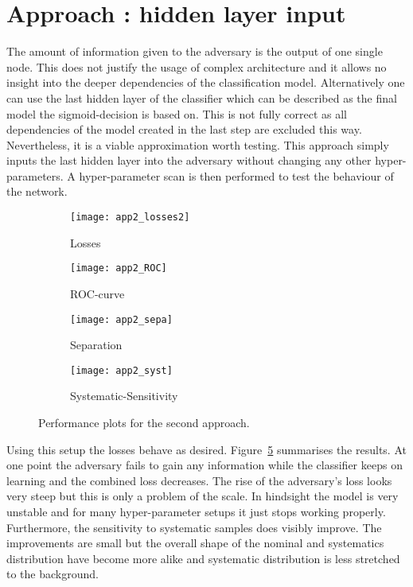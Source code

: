 \section{Approach : hidden layer input}

The amount of information given to the adversary is the output of one single node. This does not justify the usage of complex architecture and it allows no insight into the deeper dependencies of the classification model. Alternatively one can use the last hidden layer of the classifier which can be described as the final model the sigmoid-decision is based on. This is not fully correct as all dependencies of the model created in the last step are excluded this way. Nevertheless, it is a viable approximation worth testing.
This approach simply inputs the last hidden layer into the adversary without changing any other hyper-parameters. A hyper-parameter scan is then performed to test the behaviour of the network.
%
\begin{figure}[htbp]
    \centering
    \begin{subfigure}[b]{0.45\textwidth}
        \texttt{[image: app2\_losses2]}
        \caption{Losses}
        \label{fig:app2:losses}
    \end{subfigure}
\quad
    \begin{subfigure}[b]{0.45\textwidth}
        \texttt{[image: app2\_ROC]}
        \caption{ROC-curve}
        \label{fig:app2:ROC}
    \end{subfigure}

    \begin{subfigure}[b]{0.45\textwidth}
		\texttt{[image: app2\_sepa]}
		\caption{Separation}
		\label{fig:app2:sepa}
	\end{subfigure}
\quad
	\begin{subfigure}[b]{0.45\textwidth}
		\texttt{[image: app2\_syst]}
		\caption{Systematic-Sensitivity}
		\label{fig:app2:syst}
	\end{subfigure}
    \caption{Performance plots for the second approach.}
	\label{fig:app2}
\end{figure}
%
%
Using this setup the losses behave as desired. Figure~\ref{fig:app2} summarises the results. At one point the adversary fails to gain any information while the classifier keeps on learning and the combined loss decreases. The rise of the adversary's loss looks very steep but this is only a problem of the scale. In hindsight the model is very unstable and for many hyper-parameter setups it just stops working properly. Furthermore, the sensitivity to systematic samples does visibly improve. The improvements are small but the overall shape of the nominal and systematics distribution have become more alike and systematic distribution is less stretched to the background.
